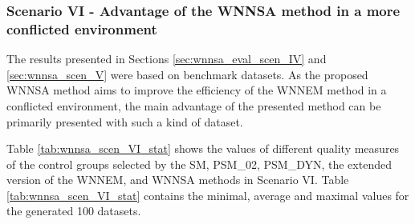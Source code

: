 				    
		\subsubsection{Scenario VI - Advantage of the WNNSA method in a more conflicted environment}
		\label{sec:wnnsa_scen_VI}
								
		The results presented in Sections \ref{sec:wnnsa_eval_scen_IV} and \ref{sec:wnnsa_scen_V} were based on benchmark datasets. As the proposed WNNSA method aims to improve the efficiency of the WNNEM method in a conflicted environment, the main advantage of the presented method can be primarily presented with such a kind of dataset. %
										
		Table \ref{tab:wnnsa_scen_VI_stat} shows the values of different quality measures of the control groups selected by the SM, PSM\_02, PSM\_DYN, the extended version of the WNNEM, and WNNSA methods in Scenario VI. Table \ref{tab:wnnsa_scen_VI_stat} contains the minimal, average and maximal values for the generated 100 datasets.
										
